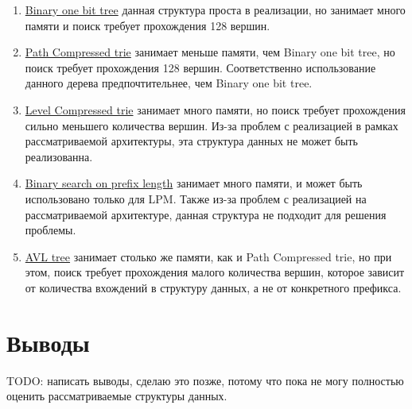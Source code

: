 \documentclass[a4peper, 12pt, titlepage, finall]{report}
\begin{document}
        \begin{enumerate}
            \item \underline{Binary one bit tree} данная структура проста в реализации, но занимает много памяти и поиск требует прохождения 128 вершин.
            \item \underline{Path Compressed trie} занимает меньше памяти, чем Binary one bit tree, но поиск требует прохождения 128 вершин. 
                Соответственно использование данного дерева предпочтительнее, чем Binary one bit tree.
            \item \underline{Level Compressed trie} занимает много памяти, но поиск требует прохождения сильно меньшего количества вершин. 
                Из-за проблем с реализацией в рамках рассматриваемой архитектуры, эта структура данных не может быть реализованна.
            \item \underline{Binary search on prefix length} занимает много памяти, и может быть использовано только для LPM\@.
                Также из-за проблем с реализацией на рассматриваемой архитектуре, данная структура не подходит для решения проблемы.
            \item \underline{AVL tree} занимает столько же памяти, как и Path Compressed trie, но при этом, поиск требует прохождения малого количества вершин,
                которое зависит от количества вхождений в структуру данных, а не от конкретного префикса.
        \end{enumerate}

    \section{Выводы}
        {\ttfamily TODO\@: написать выводы, сделаю это позже, потому что пока не могу полностью оценить рассматриваемые структуры данных.}


        \printbibliography{}
\end{document}
